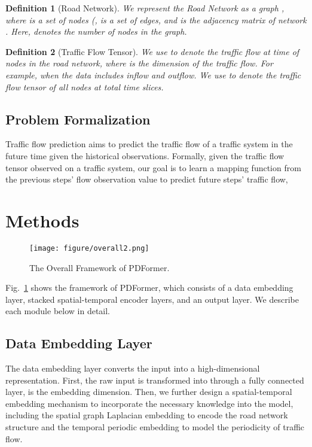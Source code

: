 \documentclass[letterpaper]{article} \usepackage{aaai23}  \usepackage{times}  \usepackage{helvet}  \usepackage{courier}  \usepackage[hyphens]{url}  \usepackage{graphicx} \urlstyle{rm} \def\UrlFont{\rm}  \usepackage{natbib}  \usepackage{caption} \frenchspacing  \setlength{\pdfpagewidth}{8.5in} \setlength{\pdfpageheight}{11in} \usepackage{algorithm}
\newtheorem{mydef}{Definition}
\newcommand{\name}{PDFormer\xspace}
\begin{document}
\begin{mydef}[Road Network]
We represent the \emph{Road Network} as a graph , where  is a set of  nodes (,  is a set of edges, and  is the adjacency matrix of network . Here,  denotes the number of nodes in the graph.
\end{mydef}



\begin{mydef}[Traffic Flow Tensor]
We use  to denote the traffic flow at time  of  nodes in the road network, where  is the dimension of the traffic flow. For example,  when the data includes inflow and outflow. We use  to denote the traffic flow tensor of all nodes at total  time slices.
\end{mydef}


\subsection{Problem Formalization}
Traffic flow prediction aims to predict the traffic flow of a traffic system in the future time given the historical observations. Formally, given the traffic flow tensor  observed on a traffic system, our goal is to learn a mapping function  from the previous  steps' flow observation value to predict future  steps' traffic flow,




\section{Methods}

\begin{figure}[t]
    \centering
    \texttt{[image: figure/overall2.png]}
    \caption{The Overall Framework of \name.}
    \label{fig:framework}
\end{figure}







Fig.~\ref{fig:framework} shows the framework of \name, which consists of a data embedding layer, stacked  spatial-temporal encoder layers, and an output layer. We describe each module below in detail.

\subsection{Data Embedding Layer}
The data embedding layer converts the input into a high-dimensional representation. First, the raw input  is transformed into  through a fully connected layer,  is the embedding dimension. Then, we further design a spatial-temporal embedding mechanism to incorporate the necessary knowledge into the model, including the spatial graph Laplacian embedding to encode the road network structure and the temporal periodic embedding to model the periodicity of traffic flow.
\end{document}
